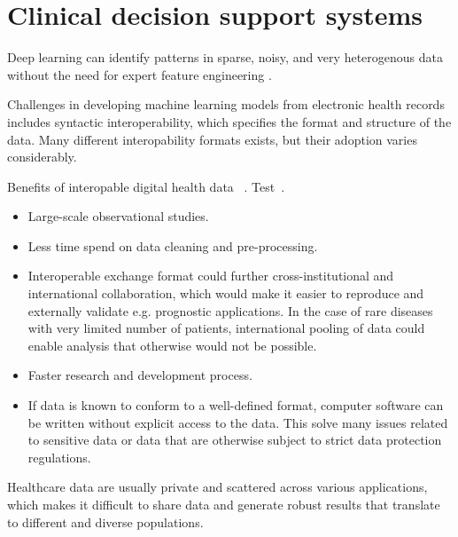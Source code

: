 
\section{Clinical decision support systems}

Deep learning can identify patterns in sparse, noisy,
and very heterogenous data without the need for expert feature engineering
\cite{norgeotCall2019}.

Challenges in developing machine learning models from electronic health records
includes syntactic interoperability, 
which specifies the format and structure of the data.
Many different interopability formats exists, 
but their adoption varies considerably.

Benefits of interopable digital health data
~\autocite{lehneWhy2019}.
Test~\cite{lehneWhy2019}.

\begin{itemize}
    \item Large-scale observational studies.
    \item Less time spend on data cleaning and pre-processing.
    \item Interoperable exchange format could further cross-institutional
    and international collaboration, which would make it easier 
    to reproduce and externally validate e.g. prognostic applications.
    In the case of rare diseases with very limited number of patients, 
    international pooling of data could enable analysis
    that otherwise would not be possible.
    \item Faster research and development process.
    \item If data is known to conform to a well-defined format,
    computer software can be written without explicit access to the data.
    This solve many issues related to sensitive data or
    data that are otherwise subject to strict data protection regulations.
\end{itemize}


Healthcare data are usually private and scattered across various applications,
which makes it difficult to share data and generate robust results 
that translate to different and diverse populations.


